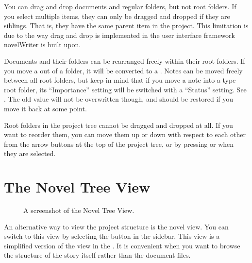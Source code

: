 \documentclass[a4paper,11pt,english]{sphinxmanual}
\begin{document}
\sphinxAtStartPar
You can drag and drop documents and regular folders, but not root folders. If you select multiple
items, they can only be dragged and dropped if they are siblings. That is, they have the same
parent item in the project. This limitation is due to the way drag and drop is implemented in the
user interface framework novelWriter is built upon.

\sphinxAtStartPar
Documents and their folders can be rearranged freely within their root folders. If you move a
 out of a  folder, it will be converted to a . Notes can
be moved freely between all root folders, but keep in mind that if you move a note into a 
type root folder, its “Importance” setting will be switched with a “Status” setting. See
{\hyperref[\detokenize{usage_project:a-ui-tree-status}]{}}. The old value will not be overwritten though, and should be restored if
you move it back at some point.

\sphinxAtStartPar
Root folders in the project tree cannot be dragged and dropped at all. If you want to reorder them,
you can move them up or down with respect to each other from the arrow buttons at the top of the
project tree, or by pressing  or  when they are selected.


\section{The Novel Tree View}
\label{\detokenize{usage_project:the-novel-tree-view}}\label{\detokenize{usage_project:a-ui-tree-novel}}
\begin{figure}[htbp]
\centering
\capstart

\noindent{}
\caption{A screenshot of the Novel Tree View.}\label{\detokenize{usage_project:id4}}\end{figure}

\sphinxAtStartPar
An alternative way to view the project structure is the novel view. You can switch to this view by
selecting the  button in the sidebar. This view is a simplified version of
the view in the . It is convenient when you want to browse the structure of the
story itself rather than the document files.
\end{document}
